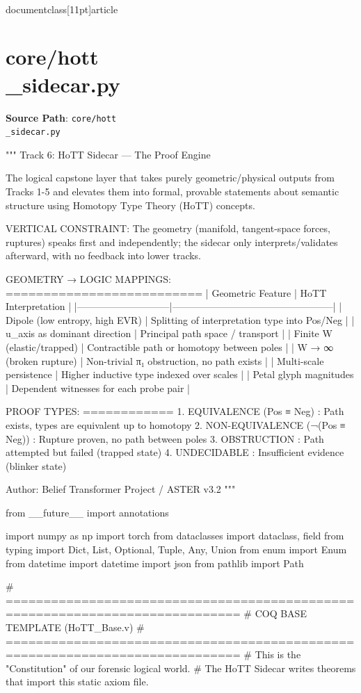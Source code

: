 \\documentclass[11pt]{article}
\begin{document}
\section*{core/hott\\_sidecar.py}
\textbf{Source Path}: \texttt{core/hott\\_sidecar.py}\par
\bigskip
\begin{CodeBlock}
"""
Track 6: HoTT Sidecar — The Proof Engine

The logical capstone layer that takes purely geometric/physical outputs from
Tracks 1-5 and elevates them into formal, provable statements about semantic
structure using Homotopy Type Theory (HoTT) concepts.

VERTICAL CONSTRAINT: The geometry (manifold, tangent-space forces, ruptures)
speaks first and independently; the sidecar only interprets/validates afterward,
with no feedback into lower tracks.

GEOMETRY → LOGIC MAPPINGS:
==========================
| Geometric Feature           | HoTT Interpretation                              |
|-----------------------------|--------------------------------------------------|
| Dipole (low entropy, high EVR) | Splitting of interpretation type into Pos/Neg  |
| u_axis as dominant direction   | Principal path space / transport               |
| Finite W (elastic/trapped)     | Contractible path or homotopy between poles    |
| W → ∞ (broken rupture)         | Non-trivial π₁ obstruction, no path exists     |
| Multi-scale persistence        | Higher inductive type indexed over scales      |
| Petal glyph magnitudes         | Dependent witnesses for each probe pair        |

PROOF TYPES:
============
1. EQUIVALENCE (Pos ≡ Neg)    : Path exists, types are equivalent up to homotopy
2. NON-EQUIVALENCE (¬(Pos ≡ Neg)) : Rupture proven, no path between poles
3. OBSTRUCTION                 : Path attempted but failed (trapped state)
4. UNDECIDABLE                 : Insufficient evidence (blinker state)

Author: Belief Transformer Project / ASTER v3.2
"""

from __future__ import annotations

import numpy as np
import torch
from dataclasses import dataclass, field
from typing import Dict, List, Optional, Tuple, Any, Union
from enum import Enum
from datetime import datetime
import json
from pathlib import Path


# =============================================================================
# COQ BASE TEMPLATE (HoTT_Base.v)
# =============================================================================
# This is the "Constitution" of our forensic logical world.
# The HoTT Sidecar writes theorems that import this static axiom file.


\end{CodeBlock}
\end{document}

